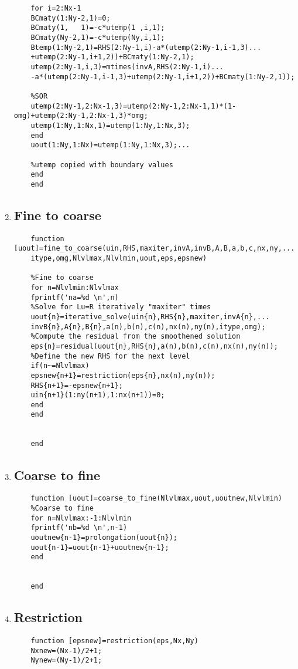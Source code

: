 \documentclass[11pt]{report}
\begin{document}
\begin{appendices}
\begin{enumerate}
\begin{verbatim}
	for i=2:Nx-1
	BCmaty(1:Ny-2,1)=0;
	BCmaty(1,   1)=-c*utemp(1 ,i,1);
	BCmaty(Ny-2,1)=-c*utemp(Ny,i,1);
	Btemp(1:Ny-2,1)=RHS(2:Ny-1,i)-a*(utemp(2:Ny-1,i-1,3)...
	+utemp(2:Ny-1,i+1,2))+BCmaty(1:Ny-2,1);
	utemp(2:Ny-1,i,3)=mtimes(invA,RHS(2:Ny-1,i)...
	-a*(utemp(2:Ny-1,i-1,3)+utemp(2:Ny-1,i+1,2))+BCmaty(1:Ny-2,1));
	
	%SOR
	utemp(2:Ny-1,2:Nx-1,3)=utemp(2:Ny-1,2:Nx-1,1)*(1-omg)+utemp(2:Ny-1,2:Nx-1,3)*omg;
	utemp(1:Ny,1:Nx,1)=utemp(1:Ny,1:Nx,3);
	end
	uout(1:Ny,1:Nx)=utemp(1:Ny,1:Nx,3);...
	
	%utemp copied with boundary values
	end
	end
	\end{verbatim}
	\item 
	
	\subsection*{Fine to coarse} 
	\begin{verbatim}
	function [uout]=fine_to_coarse(uin,RHS,maxiter,invA,invB,A,B,a,b,c,nx,ny,...
	itype,omg,Nlvlmax,Nlvlmin,uout,eps,epsnew)
	
	%Fine to coarse
	for n=Nlvlmin:Nlvlmax
	fprintf('na=%d \n',n)
	%Solve for Lu=R iteratively "maxiter" times
	uout{n}=iterative_solve(uin{n},RHS{n},maxiter,invA{n},...
	invB{n},A{n},B{n},a(n),b(n),c(n),nx(n),ny(n),itype,omg);
	%Compute the residual from the smoothened solution
	eps{n}=residual(uout{n},RHS{n},a(n),b(n),c(n),nx(n),ny(n));
	%Define the new RHS for the next level
	if(n~=Nlvlmax)
	epsnew{n+1}=restriction(eps{n},nx(n),ny(n));
	RHS{n+1}=-epsnew{n+1};
	uin{n+1}(1:ny(n+1),1:nx(n+1))=0;
	end
	end
	
	
	end
	\end{verbatim}
	\item  
	\subsection*{Coarse to fine}
	\begin{verbatim}
	function [uout]=coarse_to_fine(Nlvlmax,uout,uoutnew,Nlvlmin)
	%Coarse to fine
	for n=Nlvlmax:-1:Nlvlmin
	fprintf('nb=%d \n',n-1)
	uoutnew{n-1}=prolongation(uout{n});
	uout{n-1}=uout{n-1}+uoutnew{n-1};
	end
	
	
	end
	\end{verbatim}
	\item 
	\subsection*{Restriction}
	\begin{verbatim}
	function [epsnew]=restriction(eps,Nx,Ny)
	Nxnew=(Nx-1)/2+1;
	Nynew=(Ny-1)/2+1;
	

\end{verbatim}
\end{enumerate}
\end{appendices}
\end{document}
